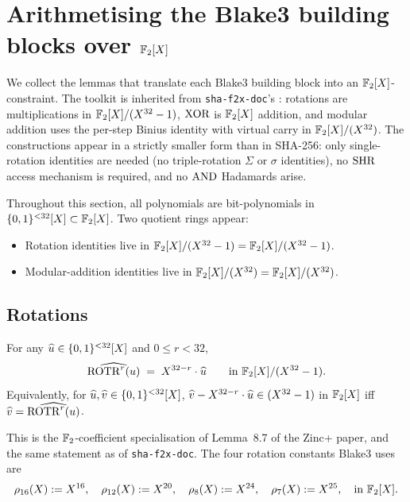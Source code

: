 \section{Arithmetising the Blake3 building blocks over $\mathbb{F}_2[X]$}\label{sec:arith}

We collect the lemmas that translate each Blake3 building block into
an $\mathbb{F}_2[X]$-constraint. The toolkit is inherited from
\texttt{sha-f2x-doc}'s : rotations are multiplications
in $\mathbb{F}_2[X]/(X^{32}-1)$, $\operatorname{XOR}$ is $\mathbb{F}_2[X]$ addition, and modular addition uses
the per-step Binius identity with virtual carry in $\mathbb{F}_2[X]/(X^{32})$. The
constructions appear in a strictly smaller form than in SHA-256: only
single-rotation identities are needed (no triple-rotation $\Sigma$ or
$\sigma$ identities), no $\operatorname{SHR}$ access mechanism is required, and no
$\operatorname{AND}$ Hadamards arise.

Throughout this section, all polynomials are bit-polynomials in
$\{0,1\}^{<32}[X] \subset \mathbb{F}_2[X]$. Two quotient rings appear:
\begin{itemize}[leftmargin=2em,topsep=2pt]
  \item Rotation identities live in $\mathbb{F}_2[X]/(X^{32}-1) = \mathbb{F}_2[X]/(X^{32}-1)$.
  \item Modular-addition identities live in $\mathbb{F}_2[X]/(X^{32}) = \mathbb{F}_2[X]/(X^{32})$.
\end{itemize}

\subsection{Rotations}\label{sec:rot}

\begin{lemma}\label{lem:b3-rot}
For any $\widehat{u} \in \{0,1\}^{<32}[X]$ and $0 \le r < 32$,
$$
\widehat{\operatorname{ROTR}^{r}(u)} \;=\; X^{32-r}\cdot \widehat{u} \qquad \text{in } \mathbb{F}_2[X]/(X^{32}-1).
$$
Equivalently, for $\widehat{u}, \widehat{v} \in \{0,1\}^{<32}[X]$,
$\widehat{v} - X^{32-r}\cdot \widehat{u} \in (X^{32}-1)$ in $\mathbb{F}_2[X]$ iff
$\widehat{v} = \widehat{\operatorname{ROTR}^{r}(u)}$.
\end{lemma}

This is the $\mathbb{F}_2$-coefficient specialisation of Lemma~8.7 of the
Zinc+ paper, and the same statement as  of
\texttt{sha-f2x-doc}. The four rotation constants Blake3 uses are
\begin{equation}\label{eq:b3-rho}
\rho_{16}(X) := X^{16}, \quad
\rho_{12}(X) := X^{20}, \quad
\rho_{8}(X)  := X^{24}, \quad
\rho_{7}(X)  := X^{25}, \quad \text{in } \mathbb{F}_2[X].
\end{equation}

